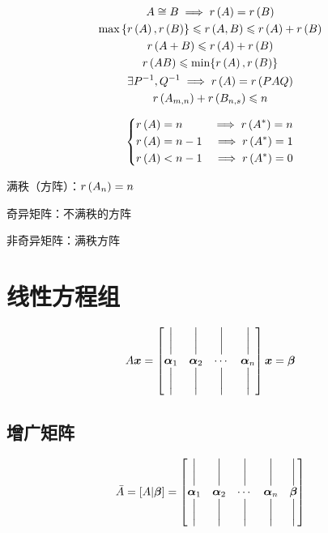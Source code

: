 \documentclass{article}
\begin{document}
\[\begin{gathered}
        A\cong B\implies r\left(A\right)=r\left(B\right)\\
        \max\left\{r\left(A\right),r\left(B\right)\right\}\leqslant r\left(A,B\right)\leqslant r\left(A\right)+r\left(B\right)\\
        r\left(A+B\right)\leqslant r\left(A\right)+r\left(B\right)\\
        r\left(AB\right)\leqslant\min\{r\left(A\right),r\left(B\right)\}\\
        \exists P^{-1},Q^{-1}\implies r\left(A\right)=r\left(PAQ\right)\\
        r\left(A_{m,n}\right)+r\left(B_{n,s}\right)\leqslant n
    \end{gathered}\]

\[\left\{\begin{aligned}
        r\left(A\right) & =n   & \implies r\left(A^*\right)=n \\
        r\left(A\right) & =n-1 & \implies r\left(A^*\right)=1 \\
        r\left(A\right) & <n-1 & \implies r\left(A^*\right)=0
    \end{aligned}\right.\]

满秩（方阵）：$r\left(A_n\right)=n$

奇异矩阵：不满秩的方阵

非奇异矩阵：满秩方阵

\section{线性方程组}

\[\def\av{\boldsymbol{\mathrm\alpha}}
    A\boldsymbol x=
    \begin{bmatrix}
        \bigg| & \bigg| & \bigg| & \bigg| \\
        \av_1  & \av_2  & \cdots & \av_n  \\
        \bigg| & \bigg| & \bigg| & \bigg|
    \end{bmatrix}\boldsymbol x=
    \boldsymbol\beta\]

\subsection{增广矩阵}

\[\def\av{\boldsymbol{\mathrm\alpha}}
    \bar A=
    \left[A|\boldsymbol{\mathrm\beta}\right]=
    \begin{bmatrix}
        \bigg| & \bigg| & \bigg| & \bigg| & \bigg|                    \\
        \av_1  & \av_2  & \cdots & \av_n  & \boldsymbol{\mathrm\beta} \\
        \bigg| & \bigg| & \bigg| & \bigg| & \bigg|
    \end{bmatrix}\]
\end{document}

